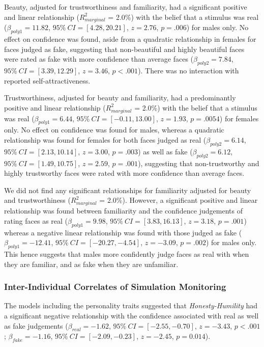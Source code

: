 \documentclass[
  man,mask,floatsintext]{apa6}
\begin{document}
Beauty, adjusted for trustworthiness and familiarity, had a significant positive and linear relationship (\(R^2_{marginal}\) = 2.0\%) with the belief that a stimulus was real (\(\beta_{poly1} = 11.82\), \(95\%~CI = [4.28, 20.21]\), \(z = 2.76\), \(p = .006\)) for males only. No effect on confidence was found, aside from a quadratic relationship in females for faces judged as fake, suggesting that non-beautiful and highly beautiful faces were rated as fake with more confidence than average faces (\(\beta_{poly2} = 7.84\), \(95\%~CI = [3.39, 12.29]\), \(z = 3.46\), \(p < .001\)). There was no interaction with reported self-attractiveness.

Trustworthiness, adjusted for beauty and familiarity, had a predominantly positive and linear relationship (\(R^2_{marginal}\) = 2.0\%) with the belief that a stimulus was real (\(\beta_{poly1} = 6.44\), \(95\%~CI = [-0.11, 13.00]\), \(z = 1.93\), \(p = .0054\)) for females only. No effect on confidence was found for males, whereas a quadratic relationship was found for females for both faces judged as real (\(\beta_{poly2} = 6.14\), \(95\%~CI = [2.13, 10.14]\), \(z = 3.00\), \(p = .003\)) as well as fake (\(\beta_{poly2} =6.12\), \(95\%~CI = [1.49, 10.75]\), \(z = 2.59\), \(p = .001\)), suggesting that non-trustworthy and highly trustworthy faces were rated with more confidence than average faces.

We did not find any significant relationships for familiarity adjusted for beauty and trustworthiness (\(R^2_{marginal}\) = 2.0\%). However, a significant positive and linear relationship was found between familiarity and the confidence judgements of rating faces as real (\(\beta_{poly1} = 9.98\), \(95\%~CI = [3.83, 16.13]\), \(z = 3.18\), \(p = .001\)) whereas a negative linear relationship was found with those judged as fake (\(\beta_{poly1} = -12.41\), \(95\%~CI = [-20.27, -4.54]\), \(z = -3.09\), \(p = .002\)) for males only. This hence suggests that males more confidently judge faces as real with when they are familiar, and as fake when they are unfamiliar.

\hypertarget{inter-individual-correlates-of-simulation-monitoring}{%
\subsubsection{Inter-Individual Correlates of Simulation Monitoring}\label{inter-individual-correlates-of-simulation-monitoring}}

The models including the personality traits suggested that \emph{Honesty-Humility} had a significant negative relationship with the confidence associated with real as well as fake judgements (\(\beta_{real} = -1.62\), \(95\%~CI = [-2.55, -0.70]\), \(z = -3.43\), \(p < .001\); \(\beta_{fake} = -1.16\), \(95\%~CI = [-2.09, -0.23]\), \(z = -2.45\), \(p = 0.014\)).
\end{document}
